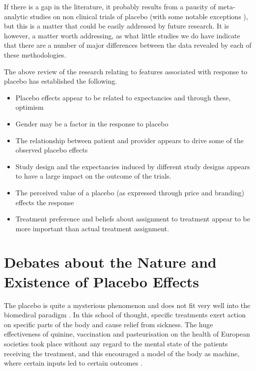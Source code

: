 
If there is a gap in the literature, it probably results from a paucity of meta-analytic studies on non clinical trials of placebo (with some notable exceptions \cite{Wampol2007,Vase2002}), but this is a matter that could be easily addressed by future research. It is however, a matter worth addressing, as what little studies we do have indicate that there are a number of major differences between the data revealed by each of these methodologies. 

The above review of the  research relating to features associated with response to placebo has established the following. 
\begin{itemize}
\item Placebo effects appear to be related to expectancies and through these, optimism
\item Gender may be a factor in the response to placebo
\item The relationship between patient and provider appears to drive some of the observed placebo effects
\item Study design and the expectancies induced by different study designs appears to have a large impact on the outcome of the trials. 
\item The perceived value of a placebo (as expressed through price and branding) effects the response
\item Treatment preference and beliefs about assignment to treatment appear to be more important than actual treatment assignment.
\end{itemize}


\section{Debates about the Nature and Existence of Placebo Effects}
\label{sec:nature-existence}

The placebo is quite a mysterious phenomenon and does not fit very well into the biomedical paradigm \cite{Kaptchuk1998} \cite{Caspi2002}. In this school of thought, specific treatments exert action on specific parts of the body and cause relief from sickness. The huge effectiveness of quinine, vaccination and pasteurisation on the health of European societies took place without any regard to the mental state of the patients receiving the treatment, and this encouraged a model of the body as machine, where certain inputs led to certain outcomes \cite{Caspi2002}. 

